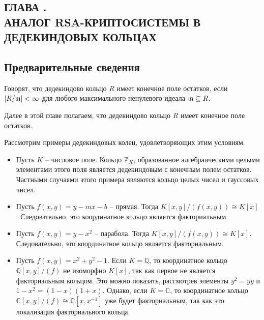 \documentclass[_00_dissertation.tex]{subfiles}
\begin{document}
\onlyinsubfile{
    \renewcommand{\contentsname}{ОГЛАВЛЕНИЕ}
    \setcounter{tocdepth}{3}
    \tableofcontents
}

\newpage
\begin{center}
    \section*{ГЛАВА .\\ АНАЛОГ RSA-КРИПТОСИСТЕМЫ В ДЕДЕКИНДОВЫХ КОЛЬЦАХ}\label{ch:RSA-cryptosystem}
\end{center}

\subsection{Предварительные сведения}

\begin{definition}
    Говорят, что дедекиндово кольцо $R$ имеет конечное поле остатков, если $|R/\mathfrak{m}| < \infty$ для любого максимального ненулевого идеала $\mathfrak{m} \subseteq R$.
\end{definition}

Далее в этой главе полагаем, что дедекиндово кольцо $R$ имеет конечное поле остатков.

\begin{example}
    Рассмотрим примеры дедекиндовых колец, удовлетворяющих этим условиям.
    \begin{itemize}
        \item Пусть $K$ -- числовое поле.
        Кольцо $\mathbb{Z}_K$, образованное алгебраическими целыми элементами этого поля является дедекиндовым с конечным полем остатков.
        Частными случаями этого примера являются кольцо целых чисел и гауссовых чисел.
        
        \item Пусть $f(x, y) = y - mx - b$ -- прямая.
        Тогда $K[x, y]/(f(x, y)) \cong K[x]$.
        Следовательно, это координатное кольцо является факториальным.
        
        \item Пусть $f(x, y) = y - x^2$ -- парабола.
        Тогда $K[x, y]/(f(x, y)) \cong K[x]$.
        Следовательно, это координатное кольцо является факториальным.
    
        \item Пусть $f(x, y) = x^2 + y^2 - 1$.
        Если $K = \mathbb{Q}$, то координатное кольцо $\mathbb{Q}[x, y]/(f)$ не изоморфно $K[x]$, так как первое не является факториальным кольцом.
        Это можно показать, рассмотрев элементы $y^2 = yy$ и $1-x^2 = (1-x)(1+x)$.
        Однако, если $K = \mathbb{C}$, то координатное кольцо $\mathbb{C}[x, y]/(f) \cong \mathbb{C}[x, x^{-1}]$ уже будет факториальным, так как это локализация факториального кольца.
    \end{itemize}
\end{example}
\end{document}
